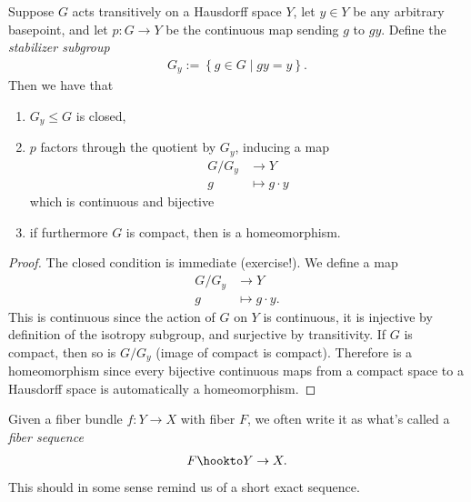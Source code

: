 \documentclass[11pt]{amsart}
\begin{document}
\begin{proposition}\label{prop:factor-space-via-group-action} 
Suppose $G$ acts transitively on a Hausdorff space $Y$, let $y\in Y$ be any arbitrary basepoint, and let $p \colon G \to Y$ be the continuous map sending $g$ to $gy$. Define the \emph{stabilizer subgroup}
\begin{align*}
    G_y := \left\{ g\in G \mid gy=y \right\}.
\end{align*}
Then we have that
\begin{enumerate}
    \item $G_y \le G$ is closed,
    \item $p$ factors through the quotient by $G_y$, inducing a map
    \begin{equation}\label{eqn:action-mod-isotropy-bijection}
    \begin{aligned}
        G/G_y &\to Y \\
        g &\mapsto g\cdot y
    \end{aligned}
    \end{equation}
    which is continuous and bijective
    \item if furthermore $G$ is compact, then  is a homeomorphism.
\end{enumerate}
\end{proposition}
\begin{proof}
The closed condition is immediate (exercise!). We define a map
\begin{align*}
    G/G_y &\to Y \\
    g &\mapsto g\cdot y.
\end{align*}
This is continuous since the action of $G$ on $Y$ is continuous, it is injective by definition of the isotropy subgroup, and surjective by transitivity. If $G$ is compact, then so is $G/G_y$ (image of compact is compact). Therefore  is a homeomorphism since every bijective continuous maps from a compact space to a Hausdorff space is automatically a homeomorphism.
\end{proof}


\begin{notation} Given a fiber bundle $f \colon Y\to X$ with fiber $F$, we often write it as what's called a \emph{fiber sequence}
\begin{align*}
    F \hookto Y \to X.
\end{align*}
This should in some sense remind us of a short exact sequence.
\end{notation}
\end{document}
